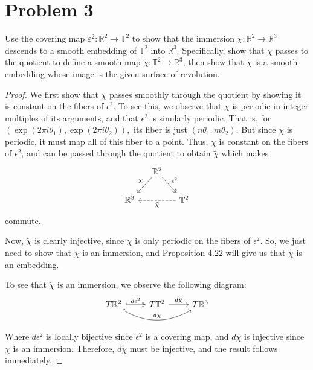 \documentclass[fontsize=11pt]{scrartcl} %
\numberwithin{equation}{section} %
\numberwithin{figure}{section} %
\numberwithin{table}{section} %
\newcommand{\R}{\mathbb{R}}
\begin{document}
\section*{Problem 3} %
Use the covering map $\varepsilon^2:\R^2\to\mathbb{T}^2$ to show that the immersion $\chi:\R^2\to\R^3$
descends to a smooth embedding of $\mathbb{T}^2$ into $\R^3$. Specifically, show that $\chi$
passes to the quotient to define a smooth map $\tilde{\chi}:\mathbb{T}^2\to\R^3$, then show
that $\tilde{\chi}$ is a smooth embedding whose image is the given surface of revolution.
\\
\begin{proof}
We first show that $\chi$ passes smoothly through the quotient by showing it is constant
on the fibers of $\epsilon^2$. To see this, we observe that $\chi$ is periodic in integer
multiples of its arguments, and that $\epsilon^2$ is similarly periodic. That is, for
$(\exp(2\pi i\theta_1),\exp(2\pi i\theta_2)),$ its fiber is just $(n\theta_1,m\theta_2)$.
But since $\chi$ is periodic, it must map all of this fiber to a point. Thus, $\chi$ is
constant on the fibers of $\epsilon^2$, and can be passed through the quotient to
obtain $\tilde{\chi}$ which makes
\[
\begin{tikzcd}[column sep=small]
 &\R^2 \arrow[swap]{dl}{\chi} \arrow[two heads]{dr}{\epsilon^2}& \\
\R^3 & & \mathbb{T}^2\arrow[dashed]{ll}{\tilde{\chi}}
\end{tikzcd}
\]
commute.

Now, $\tilde{\chi}$ is clearly injective, since $\chi$ is only periodic on the fibers of $\epsilon^2$.
So, we just need to show that $\tilde{\chi}$ is an immersion, and Proposition 4.22 will
give us that $\tilde{\chi}$ is an embedding.

To see that $\tilde{\chi}$ is an immersion, we observe the following diagram:
\[
\begin{tikzcd}
T\R^2\arrow[bend right, hook]{rr}{d\chi} \arrow[hook, two heads]{r}{d\epsilon^2} & T\mathbb{T}^2 \arrow{r}{d\tilde{\chi}} & T\R^3\\
\end{tikzcd}
\]
Where $d\epsilon^2$ is locally bijective since $\epsilon^2$ is a covering map, and
$d\chi$ is injective since $\chi$ is an immersion. Therefore, $d\tilde{\chi}$ must be
injective, and the result follows immediately.
\end{proof}
\newpage
\end{document}
